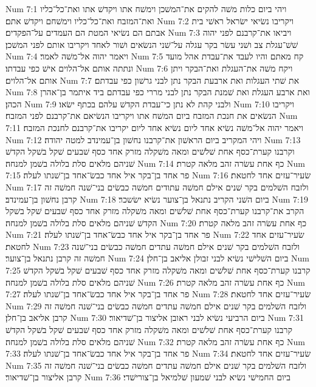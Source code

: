 Num 7:1  ויהי ביום כלות משׁה להקים את־המשׁכן וימשׁח אתו ויקדשׁ אתו ואת־כל־כליו ואת־המזבח ואת־כל־כליו וימשׁחם ויקדשׁ אתם׃
Num 7:2  ויקריבו נשׂיאי ישׂראל ראשׁי בית אבתם הם נשׂיאי המטת הם העמדים על־הפקדים׃
Num 7:3  ויביאו את־קרבנם לפני יהוה שׁשׁ־עגלת צב ושׁני עשׂר בקר עגלה על־שׁני הנשׂאים ושׁור לאחד ויקריבו אותם לפני המשׁכן׃
Num 7:4  ויאמר יהוה אל־משׁה לאמר׃
Num 7:5  קח מאתם והיו לעבד את־עבדת אהל מועד ונתתה אותם אל־הלוים אישׁ כפי עבדתו׃
Num 7:6  ויקח משׁה את־העגלת ואת־הבקר ויתן אותם אל־הלוים׃
Num 7:7  את שׁתי העגלות ואת ארבעת הבקר נתן לבני גרשׁון כפי עבדתם׃
Num 7:8  ואת ארבע העגלת ואת שׁמנת הבקר נתן לבני מררי כפי עבדתם ביד איתמר בן־אהרן הכהן׃
Num 7:9  ולבני קהת לא נתן כי־עבדת הקדשׁ עלהם בכתף ישׂאו׃
Num 7:10  ויקריבו הנשׂאים את חנכת המזבח ביום המשׁח אתו ויקריבו הנשׂיאם את־קרבנם לפני המזבח׃
Num 7:11  ויאמר יהוה אל־משׁה נשׂיא אחד ליום נשׂיא אחד ליום יקריבו את־קרבנם לחנכת המזבח׃
Num 7:12  ויהי המקריב ביום הראשׁון את־קרבנו נחשׁון בן־עמינדב למטה יהודה׃
Num 7:13  וקרבנו קערת־כסף אחת שׁלשׁים ומאה משׁקלה מזרק אחד כסף שׁבעים שׁקל בשׁקל הקדשׁ שׁניהם מלאים סלת בלולה בשׁמן למנחה׃
Num 7:14  כף אחת עשׂרה זהב מלאה קטרת׃
Num 7:15  פר אחד בן־בקר איל אחד כבשׂ־אחד בן־שׁנתו לעלה׃
Num 7:16  שׂעיר־עזים אחד לחטאת׃
Num 7:17  ולזבח השׁלמים בקר שׁנים אילם חמשׁה עתודים חמשׁה כבשׂים בני־שׁנה חמשׁה זה קרבן נחשׁון בן־עמינדב׃
Num 7:18  ביום השׁני הקריב נתנאל בן־צוער נשׂיא ישׂשכר׃
Num 7:19  הקרב את־קרבנו קערת־כסף אחת שׁלשׁים ומאה משׁקלה מזרק אחד כסף שׁבעים שׁקל בשׁקל הקדשׁ שׁניהם מלאים סלת בלולה בשׁמן למנחה׃
Num 7:20  כף אחת עשׂרה זהב מלאה קטרת׃
Num 7:21  פר אחד בן־בקר איל אחד כבשׂ־אחד בן־שׁנתו לעלה׃
Num 7:22  שׂעיר־עזים אחד לחטאת׃
Num 7:23  ולזבח השׁלמים בקר שׁנים אילם חמשׁה עתדים חמשׁה כבשׂים בני־שׁנה חמשׁה זה קרבן נתנאל בן־צוער׃
Num 7:24  ביום השׁלישׁי נשׂיא לבני זבולן אליאב בן־חלן׃
Num 7:25  קרבנו קערת־כסף אחת שׁלשׁים ומאה משׁקלה מזרק אחד כסף שׁבעים שׁקל בשׁקל הקדשׁ שׁניהם מלאים סלת בלולה בשׁמן למנחה׃
Num 7:26  כף אחת עשׂרה זהב מלאה קטרת׃
Num 7:27  פר אחד בן־בקר איל אחד כבשׂ־אחד בן־שׁנתו לעלה׃
Num 7:28  שׂעיר־עזים אחד לחטאת׃
Num 7:29  ולזבח השׁלמים בקר שׁנים אילם חמשׁה עתדים חמשׁה כבשׂים בני־שׁנה חמשׁה זה קרבן אליאב בן־חלן׃
Num 7:30  ביום הרביעי נשׂיא לבני ראובן אליצור בן־שׁדיאור׃
Num 7:31  קרבנו קערת־כסף אחת שׁלשׁים ומאה משׁקלה מזרק אחד כסף שׁבעים שׁקל בשׁקל הקדשׁ שׁניהם מלאים סלת בלולה בשׁמן למנחה׃
Num 7:32  כף אחת עשׂרה זהב מלאה קטרת׃
Num 7:33  פר אחד בן־בקר איל אחד כבשׂ־אחד בן־שׁנתו לעלה׃
Num 7:34  שׂעיר־עזים אחד לחטאת׃
Num 7:35  ולזבח השׁלמים בקר שׁנים אילם חמשׁה עתדים חמשׁה כבשׂים בני־שׁנה חמשׁה זה קרבן אליצור בן־שׁדיאור׃
Num 7:36  ביום החמישׁי נשׂיא לבני שׁמעון שׁלמיאל בן־צורישׁדי׃
